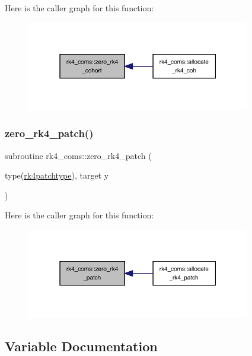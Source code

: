 Here is the caller graph for this function\+:
\nopagebreak
\begin{figure}[H]
\begin{center}
\leavevmode
\includegraphics[width=277pt]{namespacerk4__coms_a1053434edb41147cb74257d6339eab8f_icgraph}
\end{center}
\end{figure}
\mbox{\label{namespacerk4__coms_a4206f404f555c50ee6570211356bd537}} 
\subsubsection{\texorpdfstring{zero\+\_\+rk4\+\_\+patch()}{zero\_rk4\_patch()}}
{\footnotesize\ttfamily subroutine rk4\+\_\+coms\+::zero\+\_\+rk4\+\_\+patch (\begin{DoxyParamCaption}\item[{type(\hyperlink{structrk4__coms_1_1rk4patchtype}{rk4patchtype}), target}]{y }\end{DoxyParamCaption})}

Here is the caller graph for this function\+:
\nopagebreak
\begin{figure}[H]
\begin{center}
\leavevmode
\includegraphics[width=277pt]{namespacerk4__coms_a4206f404f555c50ee6570211356bd537_icgraph}
\end{center}
\end{figure}


\subsection{Variable Documentation}
\mbox{\label{namespacerk4__coms_a2da1f732b9648b485c93d62814060cf2}} 
